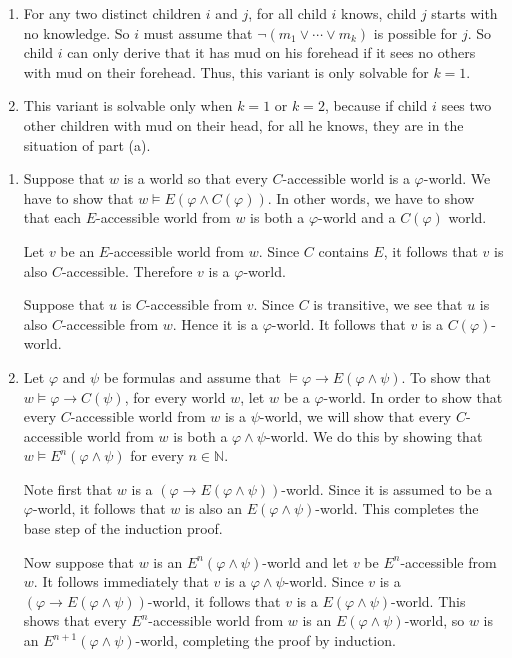 \documentclass{article}
\begin{document}
\begin{ex}
\begin{enumerate}
\item For any two distinct children $i$ and $j$, for all child $i$ knows,
child $j$ starts with no knowledge. So $i$ must assume that 
$\neg(m_1\lor\cdots\lor m_k)$ is possible for $j$. So child $i$ can only
derive that it has mud on his forehead if it sees no others with mud on their
forehead. Thus, this variant is only solvable for $k=1$.
\item This variant is solvable only when $k=1$ or $k=2$, because if child
$i$ sees two other children with mud on their head, for all he knows, they
are in the situation of part (a).
\end{enumerate}
\end{ex}

\begin{ex}
\begin{enumerate}
\item Suppose that $w$ is a world so that every $C$-accessible world is a
$\varphi$-world. We have to show that $w\models E(\varphi\land C(\varphi))$.
In other words, we have to show that each $E$-accessible world from $w$ is
both a $\varphi$-world and a $C(\varphi)$ world.

Let $v$ be an $E$-accessible world from $w$. 
Since $C$ contains $E$, it follows that $v$ is also 
$C$-accessible. Therefore $v$ is a $\varphi$-world.

Suppose that $u$ is $C$-accessible from $v$. Since $C$ is transitive, we see
that $u$ is also $C$-accessible from $w$. Hence it is a $\varphi$-world. It
follows that $v$ is a $C(\varphi)$-world.
\item Let $\varphi$ and $\psi$ be formulas and assume that
$\models \varphi\to E(\varphi\land\psi)$. To show that $w\models\varphi\to C(\psi)$,
for every world $w$, let $w$ be a $\varphi$-world. In order to show that every
$C$-accessible world from $w$ is a $\psi$-world, we will show that every $C$-accessible
world from $w$ is both a $\varphi\land\psi$-world. We do this by showing
that $w\models E^n(\varphi\land\psi)$ for every $n\in\mathbb{N}$.

Note first that $w$ is a $(\varphi\to E(\varphi\land\psi))$-world. Since it is
assumed to be a $\varphi$-world, it follows that $w$ is also an $E(\varphi\land
\psi)$-world. This completes the base step of the induction proof.

Now suppose that $w$ is an $E^n(\varphi\land\psi)$-world and let $v$ be
$E^n$-accessible from $w$. It follows immediately that $v$ is a
$\varphi\land\psi$-world. Since $v$ is a $(\varphi\to E(\varphi\land\psi))$-world,
it follows that $v$ is a $E(\varphi\land\psi)$-world. This shows that every
$E^n$-accessible world from $w$ is an $E(\varphi\land\psi)$-world, so $w$ is
an $E^{n+1}(\varphi\land\psi)$-world,
completing the proof by induction.

\end{enumerate}
\end{ex}
\end{document}

